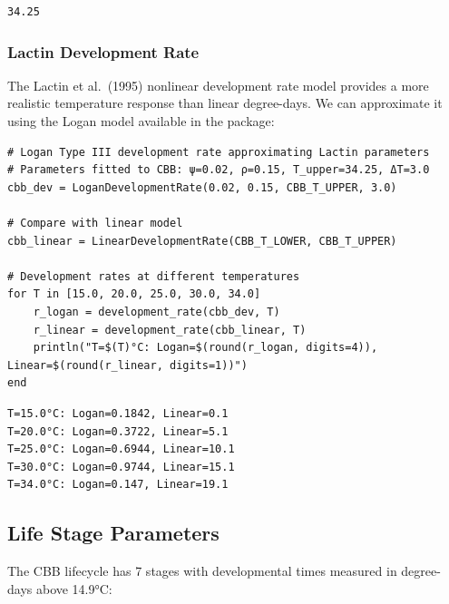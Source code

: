\begin{verbatim}
34.25
\end{verbatim}



\subsubsection{Lactin Development Rate}



\label{11406512236856223838}{}


The Lactin et al.~(1995) nonlinear development rate model provides a more realistic temperature response than linear degree-days. We can approximate it using the Logan model available in the package:




\begin{verbatim}
# Logan Type III development rate approximating Lactin parameters
# Parameters fitted to CBB: ψ=0.02, ρ=0.15, T_upper=34.25, ΔT=3.0
cbb_dev = LoganDevelopmentRate(0.02, 0.15, CBB_T_UPPER, 3.0)

# Compare with linear model
cbb_linear = LinearDevelopmentRate(CBB_T_LOWER, CBB_T_UPPER)

# Development rates at different temperatures
for T in [15.0, 20.0, 25.0, 30.0, 34.0]
    r_logan = development_rate(cbb_dev, T)
    r_linear = development_rate(cbb_linear, T)
    println("T=$(T)°C: Logan=$(round(r_logan, digits=4)), Linear=$(round(r_linear, digits=1))")
end
\end{verbatim}




\begin{verbatim}
T=15.0°C: Logan=0.1842, Linear=0.1
T=20.0°C: Logan=0.3722, Linear=5.1
T=25.0°C: Logan=0.6944, Linear=10.1
T=30.0°C: Logan=0.9744, Linear=15.1
T=34.0°C: Logan=0.147, Linear=19.1
\end{verbatim}



\subsection{Life Stage Parameters}



\label{18256094329443744124}{}


The CBB lifecycle has 7 stages with developmental times measured in degree-days above 14.9°C:




